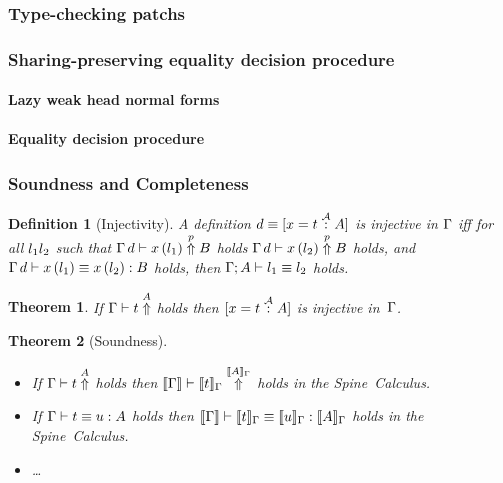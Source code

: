 \documentclass[9pt,authoryear]{sigplanconf}
\newtheorem{theorem}{Theorem}
\newtheorem{definition}{Definition}
\begin{document}
\subsubsection{Type-checking patchs}


\subsubsection{Sharing-preserving equality decision procedure}

\paragraph{Lazy weak head normal forms}


\paragraph{Equality decision procedure}


\subsubsection{Soundness and Completeness}

\begin{definition}[Injectivity]
A definition $d \equiv [x = t \stackrel{\mathcal{A}}{:} A]$ is injective
in $\Gamma$ iff for all $l_1 l_2$ such that
$\Gamma \, d \vdash x\,(l_1) \stackrel{p}{\Uparrow} B$ holds
$\Gamma \, d \vdash x\,(l_2) \stackrel{p}{\Uparrow} B$
holds, and
$\Gamma \, d \vdash x\,(l_1) \equiv x\,(l_2) : B$
holds, then $\Gamma; A \vdash l_1 \equiv l_2$ holds. 
\end{definition}

\begin{theorem}
If $\tcterm{\tyenv}{\term}{\type}$ holds then $[x = t \stackrel{\mathcal{A}}{:} A]$ is
injective in~$\Gamma$.
\end{theorem}

\begin{theorem}[Soundness]\ \\[-1em]
\begin{itemize}
\item  If $\tcterm{\tyenv}{\term}{\type}$ holds then 
$\tcterm{\interprettyenv{\tyenv}}{\interpret{\term}{\tyenv}}{\interpret{\type}{\tyenv}}$
holds in the Spine~Calculus. 
\item If $\Gamma \vdash t \equiv u : A$ holds then
$\llbracket \Gamma \rrbracket \vdash \llbracket t \rrbracket_{\Gamma} \equiv \llbracket u \rrbracket_{\Gamma} : \llbracket A \rrbracket_{\Gamma}$
holds in the Spine~Calculus. 
\item \ldots
\end{itemize}
\end{theorem}
\end{document}
